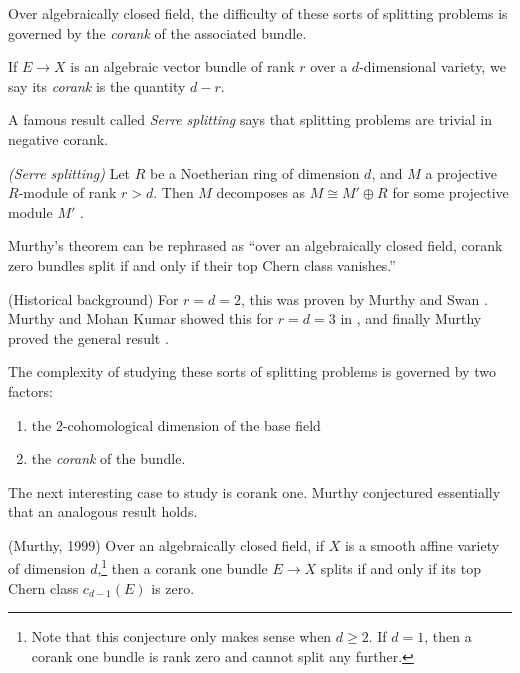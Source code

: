 \documentclass[11pt,openany]{book}
\begin{document}
Over algebraically closed field, the difficulty of these sorts of splitting problems is governed by the \textit{corank} of the associated bundle.

\begin{definition} If $E \to X$ is an algebraic vector bundle of rank $r$ over a $d$-dimensional variety, we say its \textit{corank} is the quantity $d-r$.
\end{definition}

A famous result called \textit{Serre splitting} says that splitting problems are trivial in negative corank.

\begin{theorem} \textit{(Serre splitting)} Let $R$ be a Noetherian ring of dimension $d$, and $M$ a projective $R$-module of rank $r > d$. Then $M$ decomposes as $M \cong M' \oplus R$ for some projective module $M'$ \cite[Theorem~1]{Serre-modulesprojectifs}.
\end{theorem}

Murthy's theorem can be rephrased as ``over an algebraically closed field, corank zero bundles split if and only if their top Chern class vanishes.''

\begin{remark} (Historical background) For $r=d=2$, this was proven by Murthy and Swan \cite{MurthySwan}. Murthy and Mohan Kumar showed this for $r=d=3$ in \cite{KumarMurthy}, and finally Murthy proved the general result \cite{Murthy94}.
\end{remark}

The complexity of studying these sorts of splitting problems is governed by two factors:
\begin{enumerate}
    \item the 2-cohomological dimension of the base field
    \item the \textit{corank} of the bundle.
\end{enumerate}

The next interesting case to study is corank one. Murthy conjectured essentially that an analogous result holds.

\begin{conjecture} (Murthy, 1999) Over an algebraically closed field, if $X$ is a smooth affine variety of dimension $d$,\footnote{Note that this conjecture only makes sense when $d\ge 2$. If $d=1$, then a corank one bundle is rank zero and cannot split any further.} then a corank one bundle $E \to X$ splits if and only if its top Chern class $c_{d-1}(E)$ is zero.
\end{conjecture}
\end{document}
